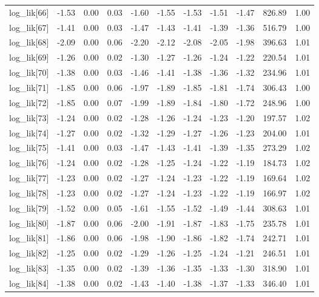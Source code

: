 \begin{table}[ht]
\begin{tabular}{rrrrrrrrrrr}
  log\_lik[66] & -1.53 & 0.00 & 0.03 & -1.60 & -1.55 & -1.53 & -1.51 & -1.47 & 826.89 & 1.00 \\ 
  log\_lik[67] & -1.41 & 0.00 & 0.03 & -1.47 & -1.43 & -1.41 & -1.39 & -1.36 & 516.79 & 1.00 \\ 
  log\_lik[68] & -2.09 & 0.00 & 0.06 & -2.20 & -2.12 & -2.08 & -2.05 & -1.98 & 396.63 & 1.01 \\ 
  log\_lik[69] & -1.26 & 0.00 & 0.02 & -1.30 & -1.27 & -1.26 & -1.24 & -1.22 & 220.54 & 1.01 \\ 
  log\_lik[70] & -1.38 & 0.00 & 0.03 & -1.46 & -1.41 & -1.38 & -1.36 & -1.32 & 234.96 & 1.01 \\ 
  log\_lik[71] & -1.85 & 0.00 & 0.06 & -1.97 & -1.89 & -1.85 & -1.81 & -1.74 & 306.43 & 1.00 \\ 
  log\_lik[72] & -1.85 & 0.00 & 0.07 & -1.99 & -1.89 & -1.84 & -1.80 & -1.72 & 248.96 & 1.00 \\ 
  log\_lik[73] & -1.24 & 0.00 & 0.02 & -1.28 & -1.26 & -1.24 & -1.23 & -1.20 & 197.57 & 1.02 \\ 
  log\_lik[74] & -1.27 & 0.00 & 0.02 & -1.32 & -1.29 & -1.27 & -1.26 & -1.23 & 204.00 & 1.01 \\ 
  log\_lik[75] & -1.41 & 0.00 & 0.03 & -1.47 & -1.43 & -1.41 & -1.39 & -1.35 & 273.29 & 1.02 \\ 
  log\_lik[76] & -1.24 & 0.00 & 0.02 & -1.28 & -1.25 & -1.24 & -1.22 & -1.19 & 184.73 & 1.02 \\ 
  log\_lik[77] & -1.23 & 0.00 & 0.02 & -1.27 & -1.24 & -1.23 & -1.22 & -1.19 & 169.64 & 1.02 \\ 
  log\_lik[78] & -1.23 & 0.00 & 0.02 & -1.27 & -1.24 & -1.23 & -1.22 & -1.19 & 166.97 & 1.02 \\ 
  log\_lik[79] & -1.52 & 0.00 & 0.05 & -1.61 & -1.55 & -1.52 & -1.49 & -1.44 & 308.63 & 1.01 \\ 
  log\_lik[80] & -1.87 & 0.00 & 0.06 & -2.00 & -1.91 & -1.87 & -1.83 & -1.75 & 235.78 & 1.01 \\ 
  log\_lik[81] & -1.86 & 0.00 & 0.06 & -1.98 & -1.90 & -1.86 & -1.82 & -1.74 & 242.71 & 1.01 \\ 
  log\_lik[82] & -1.25 & 0.00 & 0.02 & -1.29 & -1.26 & -1.25 & -1.24 & -1.21 & 246.51 & 1.01 \\ 
  log\_lik[83] & -1.35 & 0.00 & 0.02 & -1.39 & -1.36 & -1.35 & -1.33 & -1.30 & 318.90 & 1.01 \\ 
  log\_lik[84] & -1.38 & 0.00 & 0.02 & -1.43 & -1.40 & -1.38 & -1.37 & -1.33 & 346.40 & 1.01 \\ 

\end{tabular}
\end{table}

